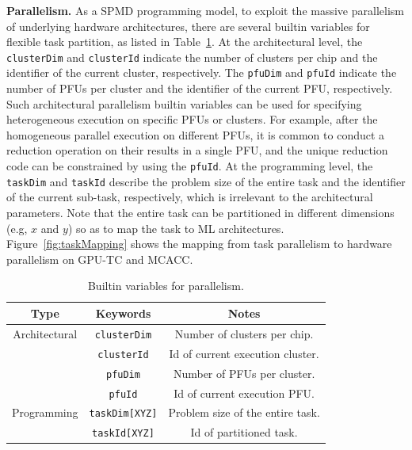 \textbf{Parallelism.} As a SPMD programming model, to exploit the massive parallelism of underlying hardware architectures, there are several builtin variables for flexible task partition, as listed in Table~\ref{tab:parallelism}. At the architectural level, the \texttt{clusterDim} and \texttt{clusterId} indicate the number of clusters per chip and the identifier of the current cluster, respectively. The \texttt{pfuDim} and \texttt{pfuId} indicate the number of PFUs per cluster and the identifier of the current PFU, respectively. Such architectural parallelism builtin variables can be used for specifying heterogeneous execution on specific PFUs or clusters. For example, after the homogeneous parallel execution on different PFUs, it is common to conduct a reduction operation on their results in a single PFU, and the unique reduction code can be constrained by using the \texttt{pfuId}. At the programming level, the \texttt{taskDim} and \texttt{taskId} describe the problem size of the entire task and the identifier of the current sub-task, respectively, which is irrelevant to the architectural parameters. Note that the entire task can be partitioned in different dimensions (e.g, $x$ and $y$) so as to map the task to ML architectures. Figure~\ref{fig:taskMapping} shows the mapping from task parallelism to hardware parallelism on GPU-TC and MCACC.

\begin{table}[b]
  \centering
  \scriptsize
  \vspace{-20pt}
\caption{\footnotesize Builtin variables for parallelism.}
  \label{tab:parallelism}
  \begin{tabular}{ccc}
    \toprule
     Type & Keywords & Notes\\
    \midrule
Architectural&\texttt{clusterDim} & Number of clusters per chip.\\
    \midrule
&\texttt{clusterId} & Id of current execution cluster.\\
    \midrule
&\texttt{pfuDim} & Number of PFUs per cluster.\\
    \midrule
&\texttt{pfuId} & Id of current execution PFU.\\
    \midrule
Programming &\texttt{taskDim[XYZ]} & Problem size of the entire task.\\
    \midrule
&\texttt{taskId[XYZ]} & Id of partitioned task.\\
    \bottomrule
  \end{tabular}
\end{table}

